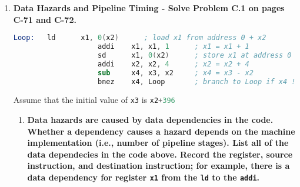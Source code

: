 \begin{enumerate}
    \item \textbf{Data Hazards and Pipeline Timing - Solve Problem C.1 on pages C-71 and C-72.}
    \begin{center}
        \begin{lstlisting}[language=Assembler]
            Loop:   ld      x1, 0(x2)      ; load x1 from address 0 + x2
                    addi    x1, x1, 1      ; x1 = x1 + 1
                    sd      x1, 0(x2)      ; store x1 at address 0 + x2
                    addi    x2, x2, 4      ; x2 = x2 + 4
                    sub     x4, x3, x2     ; x4 = x3 - x2
                    bnez    x4, Loop       ; branch to Loop if x4 != 0
        \end{lstlisting}
        Assume that the initial value of \lstinline[language=Assembler] {x3} is \lstinline[language=Assembler]{x2+396}
    \end{center}
    
    \begin{enumerate}
        \item \textbf{Data hazards are caused by data dependencies in the code. Whether a dependency causes a hazard depends on the machine implementation (i.e., number of pipeline stages). List all of the data dependecies in the code above. Record the register, source instruction, and destination instruction; for example, there is a data dependency for register \lstinline[language=Assembler]{x1} from the \lstinline[language=Assembler]{ld} to the \lstinline[language=Assembler]{addi}.}
        

\end{enumerate}
\end{enumerate}
